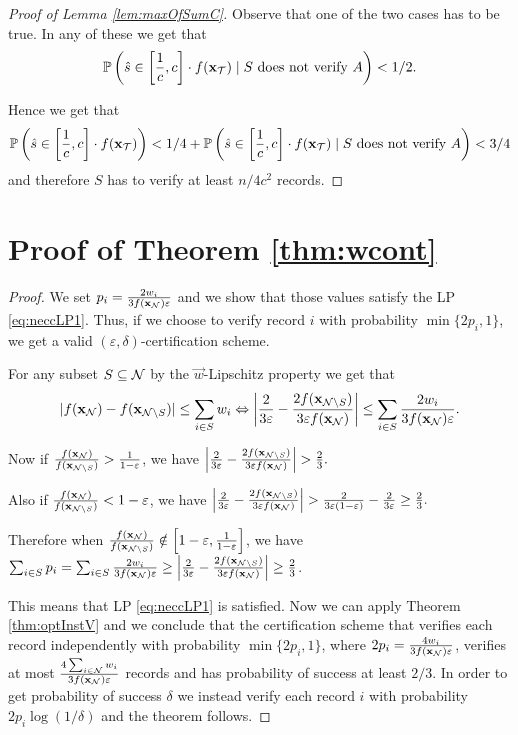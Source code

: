 \begin{proof}[Proof of Lemma \ref{lem:maxOfSumC}]
\noindent Observe that one of the two cases has to be true. In any of these we get that 
\[ \mathbb{P}\left(\hat{s} \in \left[\frac{1}{c}, c\right] \cdot f(\mathbf{x}_{\mathcal{T}}) \mid  S \text{ does not verify } A\right) < 1/2. \]

\noindent Hence we get that  
\[ \mathbb{P}\left(\hat{s} \in \left[\frac{1}{c}, c\right] \cdot f(\mathbf{x}_{\mathcal{T}})\right) < 1/4 + \mathbb{P}\left(\hat{s} \in \left[\frac{1}{c}, c\right] \cdot f(\mathbf{x}_{\mathcal{T}}) \mid  S \text{ does not verify } A\right) < 3/4 \]
\noindent and therefore $S$ has to verify at least $n / 4 c^2$ records.
\end{proof}

\section{Proof of Theorem \ref{thm:wcont}} \label{sec:app:proofOfLipschitz}

 \begin{proof}
      We set $p_i = \frac{2w_i}{3 f(\mathbf{x}_{\mathcal{N}}) \varepsilon}$ and we show that %
    those values satisfy the LP \eqref{eq:neccLP1}. Thus, if we choose to verify record $i$ with probability $\min\{2p_i, 1\}$, we 
    get a valid $(\varepsilon,\delta)$-certification scheme.

    For any subset $S \subseteq \mathcal{N}$ by the  $\vec{w}$-Lipschitz property we get that
    \[ |f(\mathbf{x}_{\mathcal{N}}) - f(\mathbf{x}_{\mathcal{N}\setminus S})| \le \sum_{i \in S} w_i \Leftrightarrow \left| \frac{2}{3 \varepsilon} - \frac{2f(\mathbf{x}_{\mathcal{N}\setminus S})}{3 \varepsilon f(\mathbf{x}_{\mathcal{N}})} \right| \le \sum_{i \in S} \frac{2w_i}{3 f(\mathbf{x}_{\mathcal{N}}) \varepsilon}. \]

    \noindent Now if $\frac{f(\mathbf{x}_{\mathcal{N}})}{f(\mathbf{x}_{\mathcal{N}\setminus S})} > \frac{1}{1 - \varepsilon}$, we have
    $ \left| \frac{2}{3 \varepsilon} - \frac{2f(\mathbf{x}_{\mathcal{N}\setminus S})}{3 \varepsilon f(\mathbf{x}_{\mathcal{N}})} \right| > \frac 2 3. $

    \noindent Also if $\frac{f(\mathbf{x}_{\mathcal{N}})}{f(\mathbf{x}_{\mathcal{N}\setminus S})} < 1 - \varepsilon$, we have
    $ \left| \frac{2}{3 \varepsilon} - \frac{2f(\mathbf{x}_{\mathcal{N}\setminus S})}{3 \varepsilon f(\mathbf{x}_{\mathcal{N}})} \right| >
    \frac{2}{3 \varepsilon (1-\varepsilon)} - \frac{2}{3 \varepsilon}  \ge \frac 2 3. $
    
    \noindent Therefore when $\frac{f(\mathbf{x}_{\mathcal{N}})}{f(\mathbf{x}_{\mathcal{N}\setminus S})} \notin \left[1 - \varepsilon, \frac{1}{1 - \varepsilon}\right]$, we have
    $\sum_{i \in S} p_i = \sum_{i \in S} \frac{2w_i}{3 f(\mathbf{x}_{\mathcal{N}}) \varepsilon} \ge \left| \frac{2}{3 \varepsilon} - \frac{2f(\mathbf{x}_{\mathcal{N}\setminus S})}{3 \varepsilon f(\mathbf{x}_{\mathcal{N}})} \right| \ge \frac{2}{3}$.

    \noindent This means that LP \eqref{eq:neccLP1} is satisfied. %
    Now we can apply Theorem \ref{thm:optInstV} and we conclude that the certification scheme that verifies each record independently 
    with probability $\min\{2p_i, 1\}$, where $2p_i = \frac{4w_i}{3 f(\mathbf{x}_{\mathcal{N}}) \varepsilon}$, verifies at most 
    $\frac{4\sum_{i \in \mathcal{N}} w_i}{3 f(\mathbf{x}_{\mathcal{N}}) \varepsilon}$ records and has probability of success at least $2/3$. In order to get 
    probability of success $\delta$ we instead verify each record $i$ with probability $2 p_i \log(1/\delta)$ and the theorem follows.
  \end{proof}

